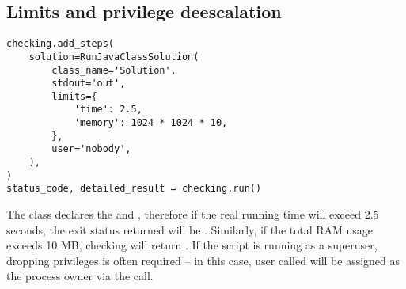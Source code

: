 \subsection{Limits and privilege deescalation}

\begin{verbatim}
checking.add_steps(
    solution=RunJavaClassSolution(
        class_name='Solution',
        stdout='out',
        limits={
            'time': 2.5,
            'memory': 1024 * 1024 * 10,
        },
        user='nobody',
    ),
)
status_code, detailed_result = checking.run()
\end{verbatim}

The  class declares the \hyperref[subsec:UsedTimePostcondition]{}
and \hyperref[subsec:UsedMemoryPostcondition]{}, therefore if the real running time will
exceed 2.5 seconds, the exit status returned will be .
Similarly, if the total RAM usage exceeds 10 MB, checking will return .
If the script is running as a superuser, dropping privileges is often required -- in this case, user called  will
be assigned as the process owner via the  call.\\
